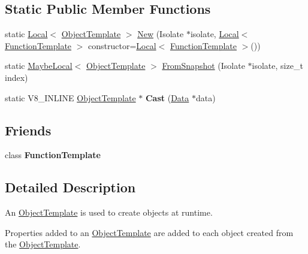 \subsection*{Static Public Member Functions}
\begin{DoxyCompactItemize}
\item 
static \mbox{\hyperlink{classv8_1_1Local}{Local}}$<$ \mbox{\hyperlink{classv8_1_1ObjectTemplate}{Object\+Template}} $>$ \mbox{\hyperlink{classv8_1_1ObjectTemplate_ae0bcd58e9e069c50148c377d774de7a1}{New}} (Isolate $\ast$isolate, \mbox{\hyperlink{classv8_1_1Local}{Local}}$<$ \mbox{\hyperlink{classv8_1_1FunctionTemplate}{Function\+Template}} $>$ constructor=\mbox{\hyperlink{classv8_1_1Local}{Local}}$<$ \mbox{\hyperlink{classv8_1_1FunctionTemplate}{Function\+Template}} $>$())
\item 
static \mbox{\hyperlink{classv8_1_1MaybeLocal}{Maybe\+Local}}$<$ \mbox{\hyperlink{classv8_1_1ObjectTemplate}{Object\+Template}} $>$ \mbox{\hyperlink{classv8_1_1ObjectTemplate_a7899f31276e3ca69358005e360e3bc27}{From\+Snapshot}} (Isolate $\ast$isolate, size\+\_\+t index)
\item 
\mbox{\label{classv8_1_1ObjectTemplate_aba82061a19144380f44994c3e57c6e60}} 
static V8\+\_\+\+I\+N\+L\+I\+NE \mbox{\hyperlink{classv8_1_1ObjectTemplate}{Object\+Template}} $\ast$ {\bfseries Cast} (\mbox{\hyperlink{classv8_1_1Data}{Data}} $\ast$data)
\end{DoxyCompactItemize}
\subsection*{Friends}
\begin{DoxyCompactItemize}
\item 
\mbox{\label{classv8_1_1ObjectTemplate_a334168ad1a5f39cf17b818ca3356aacd}} 
class {\bfseries Function\+Template}
\end{DoxyCompactItemize}


\subsection{Detailed Description}
An \mbox{\hyperlink{classv8_1_1ObjectTemplate}{Object\+Template}} is used to create objects at runtime.

Properties added to an \mbox{\hyperlink{classv8_1_1ObjectTemplate}{Object\+Template}} are added to each object created from the \mbox{\hyperlink{classv8_1_1ObjectTemplate}{Object\+Template}}. 

